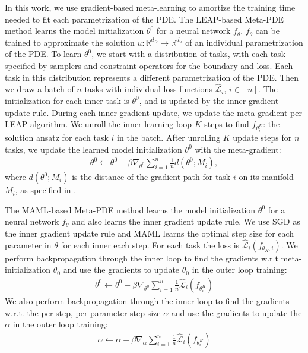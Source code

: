 In this work, we use gradient-based meta-learning to amortize the training time needed to fit each parametrization of the PDE. The LEAP-based Meta-PDE method learns the model initialization $\theta^0$ for a neural network $f_\theta$. $f_\theta$ can be trained to approximate the solution $u: \mathbb{R}^{d_\Omega} \to \mathbb{R}^{d_u}$ of an individual parametrization of the PDE. To learn $\theta^0$, we start with a distribution of tasks, with each task specified by samplers and constraint operators for the boundary and loss. Each task in this distribution represents a different parametrization of the PDE. Then we draw a batch of $n$ tasks with individual loss functions $\hat{\mathcal{L}}_i$, $i \in [n]$. The initialization for each inner task is $\theta^0$, and is updated by the inner gradient update rule. During each inner gradient update, we update the meta-gradient per LEAP algorithm. We unroll the inner learning loop $K$ steps to find $f_{\theta_i^K}$: the solution ansatz for each task $i$ in the batch. After unrolling $K$ update steps for $n$ tasks, we update the learned model initialization $\theta^0$ with the meta-gradient:
\begin{align}
    \theta^0 \leftarrow \theta^0 - \beta \nabla_{\theta^0}\sum_{i=1}^n \frac{1}{n} d(\theta^0; M_i),
\end{align}
where $d(\theta^0; M_i)$ is the distance of the gradient path for task $i$ on its manifold $M_i$, as specified in \citep{flennerhag2018transferring}.

The MAML-based Meta-PDE method learns the model initialization $\theta^0$ for a neural network $f_\theta$ and also learns the inner gradient update rule. We use SGD as the inner gradient update rule and MAML learns the optimal step size for each parameter in $\theta$ for each inner each step. For each task the loss is $\hat{\mathcal{L}}_i(f_{\theta_K, i})$. We perform backpropagation through the inner loop to find the gradients w.r.t meta-initialization $\theta_0$ and use the gradients to update $\theta_0$ in the outer loop training:
\begin{align}
    \theta^0 \leftarrow \theta^0 - \beta \nabla_{\theta^0} \sum_{i=1}^n  \frac{1}{n} \hat{\mathcal{L}}_i(f_{\theta^K _i})
\end{align}
We also perform backpropagation through the inner loop to find the gradients w.r.t. the per-step, per-parameter step size $\alpha$ and use the gradients to update the $\alpha$ in the outer loop training:
\begin{align}
    {\alpha}  \leftarrow {\alpha} - \beta  \nabla_{\alpha} \sum_{i=1}^n  \frac{1}{n} \hat{\mathcal{L}}_i(f_{\theta^K_i})
\end{align}

